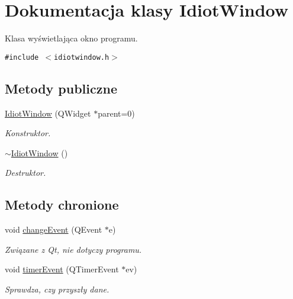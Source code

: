 \hypertarget{class_idiot_window}{
\section{Dokumentacja klasy IdiotWindow}
\label{class_idiot_window}
}
Klasa wyświetlająca okno programu.  


{\tt \#include $<$idiotwindow.h$>$}

\subsection*{Metody publiczne}
\begin{CompactItemize}
\item 
\hyperlink{class_idiot_window_028f2a727c252dcb9448a08d1379d699}{IdiotWindow} (QWidget $\ast$parent=0)
\begin{CompactList}\small\item\em Konstruktor. \item\end{CompactList}\item 
\hyperlink{class_idiot_window_2a5adb99723cac75bcf4c843653ef76b}{$\sim$IdiotWindow} ()
\begin{CompactList}\small\item\em Destruktor. \item\end{CompactList}\end{CompactItemize}
\subsection*{Metody chronione}
\begin{CompactItemize}
\item 
\hypertarget{class_idiot_window_67aa3314cc4dc981af280288f6f16b96}{
void \hyperlink{class_idiot_window_67aa3314cc4dc981af280288f6f16b96}{changeEvent} (QEvent $\ast$e)}
\label{class_idiot_window_67aa3314cc4dc981af280288f6f16b96}

\begin{CompactList}\small\item\em Związane z Qt, nie dotyczy programu. \item\end{CompactList}\item 
void \hyperlink{class_idiot_window_0e90dfa970f643c1d42d1449d648cf50}{timerEvent} (QTimerEvent $\ast$ev)
\begin{CompactList}\small\item\em Sprawdza, czy przyszły dane. \item\end{CompactList}\end{CompactItemize}


